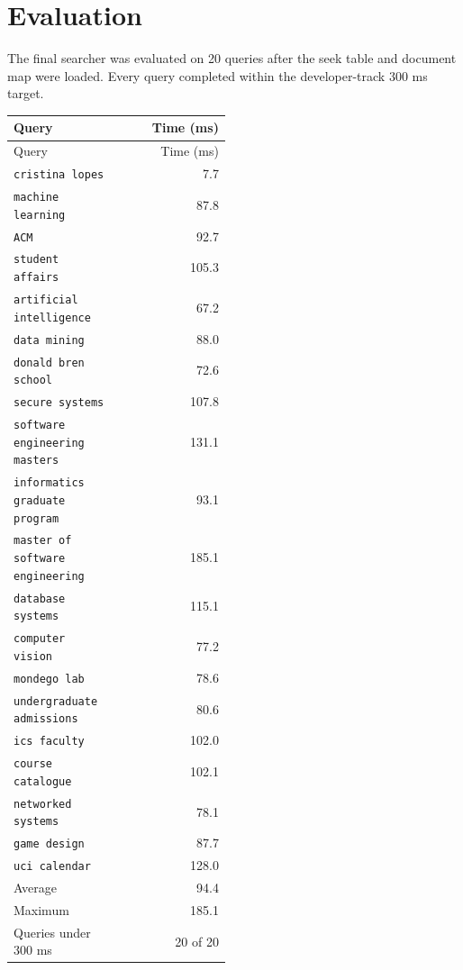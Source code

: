 \documentclass[11pt]{article}
\newcommand{\code}[1]{\texttt{#1}}
\begin{document}
\section{Evaluation}

The final searcher was evaluated on 20 queries after the seek table and document
map were loaded. Every query completed within the developer-track 300 ms target.

\begin{center}
\begin{longtable}{>{\raggedright\arraybackslash}p{0.48\linewidth}r}
\toprule
Query & Time (ms) \\
\midrule
\endfirsthead
\toprule
Query & Time (ms) \\
\midrule
\endhead
\code{cristina lopes} & 7.7 \\
\code{machine learning} & 87.8 \\
\code{ACM} & 92.7 \\
\code{student affairs} & 105.3 \\
\code{artificial intelligence} & 67.2 \\
\code{data mining} & 88.0 \\
\code{donald bren school} & 72.6 \\
\code{secure systems} & 107.8 \\
\code{software engineering masters} & 131.1 \\
\code{informatics graduate program} & 93.1 \\
\code{master of software engineering} & 185.1 \\
\code{database systems} & 115.1 \\
\code{computer vision} & 77.2 \\
\code{mondego lab} & 78.6 \\
\code{undergraduate admissions} & 80.6 \\
\code{ics faculty} & 102.0 \\
\code{course catalogue} & 102.1 \\
\code{networked systems} & 78.1 \\
\code{game design} & 87.7 \\
\code{uci calendar} & 128.0 \\
\midrule
Average & 94.4 \\
Maximum & 185.1 \\
Queries under 300 ms & 20 of 20 \\
\bottomrule
\end{longtable}
\end{center}
\end{document}
